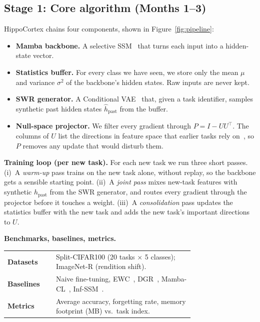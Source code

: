 \documentclass[11pt,a4paper]{article}
\begin{document}
\subsection{Stage 1: Core algorithm (Months 1--3)}
HippoCortex chains four components, shown in Figure~\ref{fig:pipeline}:
\begin{itemize}[leftmargin=1.4em,itemsep=0.05em,topsep=0.1em]
  \item \textbf{Mamba backbone.} A selective SSM~\citep{gu2023mamba} that turns each input into a hidden-state vector.
  \item \textbf{Statistics buffer.} For every class we have seen, we store only the mean $\mu$ and variance $\sigma^{2}$ of the backbone's hidden states. Raw inputs are never kept.
  \item \textbf{SWR generator.} A Conditional VAE~\citep{sohn2015learning} that, given a task identifier, samples synthetic past hidden states $\hat{h}_{\text{past}}$ from the buffer.
  \item \textbf{Null-space projector.} We filter every gradient through $P=I-UU^{\top}$. The columns of $U$ list the directions in feature space that earlier tasks rely on~\citep{saha2021gradient,cheng2024mambacl}, so $P$ removes any update that would disturb them.
\end{itemize}

\textbf{Training loop (per new task).} For each new task we run three short passes. (i)~A \emph{warm-up} pass trains on the new task alone, without replay, so the backbone gets a sensible starting point. (ii)~A \emph{joint pass} mixes new-task features with synthetic $\hat{h}_{\text{past}}$ from the SWR generator, and routes every gradient through the projector before it touches a weight. (iii)~A \emph{consolidation} pass updates the statistics buffer with the new task and adds the new task's important directions to $U$.

\textbf{Benchmarks, baselines, metrics.}

\begin{center}\small
\begin{tabular}{@{}l p{0.74\linewidth}@{}}
\toprule
\textbf{Datasets}   & Split-CIFAR100 (20 tasks $\times$ 5 classes); ImageNet-R (rendition shift). \\
\textbf{Baselines}  & Naive fine-tuning, EWC~\citep{kirkpatrick2017overcoming}, DGR~\citep{shin2017continual}, Mamba-CL~\citep{cheng2024mambacl}, Inf-SSM~\citep{lee2025exemplarfree}. \\
\textbf{Metrics}    & Average accuracy, forgetting rate, memory footprint (MB) vs.\ task index. \\
\bottomrule
\end{tabular}
\end{center}
\end{document}
